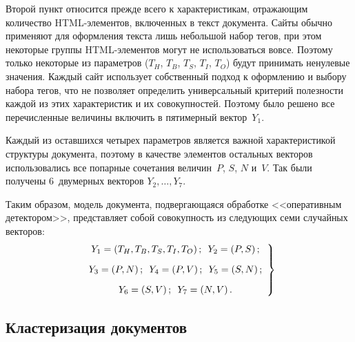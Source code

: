 \begin{multicols}{2}
    Второй пункт относится прежде всего к характеристикам, отражающим 
количество HTML-эле\-мен\-тов, включенных в текст документа. Сайты 
обычно применяют для оформления текста лишь небольшой набор тегов, при 
этом некоторые группы HTML-эле\-мен\-тов могут не использоваться вовсе. 
Поэтому только некоторые из параметров ($T_H$, $T_B$, $T_S$, $T_I$, 
$T_O$) будут принимать ненулевые значения. Каждый сайт использует 
собственный подход к оформлению и выбору набора тегов, что не позволяет 
определить универсальный критерий по\-лез\-ности каждой из этих характеристик 
и их совокупностей. Поэтому было решено все перечисленные величины 
включить в пятимерный вектор~$Y_1$.
  
    Каждый из оставшихся четырех параметров является важной 
характеристикой структуры документа, поэтому в качестве элементов 
остальных векторов использовались все попарные сочетания величин~$P$, $S$, 
$N$ и~$V$. Так были получены 6~двумерных векторов $Y_2, \ldots , Y_7$.
  
    Таким образом, модель документа, под\-вер\-га\-юща\-я\-ся обработке 
<<оперативным детектором>>, представляет собой совокупность из следующих 
семи случайных векторов:
  \begin{equation}
  \left.
  \begin{array}{c}
  Y_1 = (T_H, T_B, T_S, T_I, T_O)\,; \enskip Y_2=(P,S)\,;\\[9pt]
  Y_3=(P,N)\,;\enskip Y_4=(P,V)\,;\enskip Y_5=(S,N)\,;\\[9pt]
  Y_6=(S,V)\,;\enskip Y_7=(N,V)\,.
  \end{array}
  \right\}
  \label{e4-and}
  \end{equation}

\subsection{Кластеризация документов}
  

\end{multicols}
